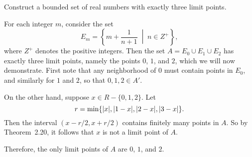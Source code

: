  Construct a bounded set of real numbers with exactly three
limit points.
\begin{solution}
  For each integer $m$, consider the set
  \begin{equation*}
    E_m = \left\{ m + \frac1{n+1}
      \;\middle|\;
      n\in Z^+ \right\},
  \end{equation*}
  where $Z^+$ denotes the positive integers. Then the set
  $A = E_0\cup E_1\cup E_2$ has exactly three limit points, namely the
  points $0$, $1$, and $2$, which we will now demonstrate. First note
  that any neighborhood of $0$ must contain points in $E_0$, and
  similarly for $1$ and $2$, so that $0,1,2\in A'$.

  On the other hand, suppose $x\in R-\{0,1,2\}$. Let
  \begin{equation*}
    r = \min\{\lvert{x}\rvert, \lvert{1 - x}\rvert, \lvert{2 - x}\rvert, \lvert{3 - x}\rvert\}.
  \end{equation*}
  Then the interval $(x - r/2, x + r/2)$ contains finitely many points
  in $A$. So by Theorem~2.20, it follows that $x$ is not a limit point
  of $A$.

  Therefore, the only limit points of $A$ are $0$, $1$, and $2$.
\end{solution}

